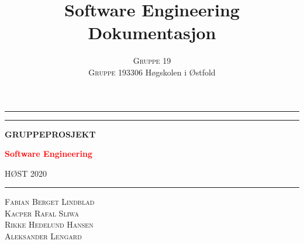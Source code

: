 \documentclass{article}
\title{Software Engineering Dokumentasjon}
\author{%
	\large
	\textsc{Gruppe 19}\\
	\textsc{Gruppe 193306}
	\normalsize	H{\o}gskolen i {\O}stfold \\
	\vspace{-5mm}	
}
\begin{document}

\begin{titlepage} %

	\centering %
	
	
	\rule{\textwidth}{1pt} %
	
	\vspace{2pt}\vspace{-\baselineskip} %
	
	\rule{\textwidth}{0.4pt} %
	
	\vspace{0.1\textheight} %
	
	
	{\Huge \uppercase{\textbf{Gruppeprosjekt}} \\[0.5\baselineskip] }

	\textcolor{Red}{ %
		{\Large \textbf{Software Engineering}} \\[0.3\baselineskip] %
	}
	
	\uppercase{Høst 2020}
	
	\vspace{0.3em} %
	
	\rule{0.3\textwidth}{0.4pt} %
	
	\vspace{0.1\textheight} %
	

	\vspace{0.6em}
	
	{\large \textsc{
	    Fabian Berget Lindblad \\[0.1em] 
	    Kacper Rafal Sliwa \\[0.1em] 
	    Rikke Hedelund Hansen \\[0.2em] 
	    Aleksander Lengard
	    }
    } %
    

\end{titlepage}
\end{document}
